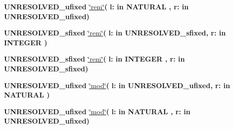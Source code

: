 \begin{DoxyCompactItemize}
\item 
{\bfseries {\bfseries \textcolor{vhdlchar}{U\+N\+R\+E\+S\+O\+L\+V\+E\+D\+\_\+ufixed}\textcolor{vhdlchar}{ }}} \hyperlink{class__fixed__pkg_a66a380593306e6133903e7a5cb03056a}{\char`\"{}rem\char`\"{}}{\bfseries  ( }{\bfseries \textcolor{vhdlchar}{l\+: }\textcolor{stringliteral}{in }{\bfseries \textcolor{comment}{N\+A\+T\+U\+R\+A\+L}\textcolor{vhdlchar}{ }}}{\bfseries  , \textcolor{vhdlchar}{r\+: }\textcolor{stringliteral}{in }\textcolor{vhdlchar}{U\+N\+R\+E\+S\+O\+L\+V\+E\+D\+\_\+ufixed}}{\bfseries  )} 
\item 
{\bfseries {\bfseries \textcolor{vhdlchar}{U\+N\+R\+E\+S\+O\+L\+V\+E\+D\+\_\+sfixed}\textcolor{vhdlchar}{ }}} \hyperlink{class__fixed__pkg_ac069740ccb193c395e563f253d734127}{\char`\"{}rem\char`\"{}}{\bfseries  ( }{\bfseries \textcolor{vhdlchar}{l\+: }\textcolor{stringliteral}{in }\textcolor{vhdlchar}{U\+N\+R\+E\+S\+O\+L\+V\+E\+D\+\_\+sfixed}}{\bfseries  , \textcolor{vhdlchar}{r\+: }\textcolor{stringliteral}{in }{\bfseries \textcolor{comment}{I\+N\+T\+E\+G\+E\+R}\textcolor{vhdlchar}{ }}}{\bfseries  )} 
\item 
{\bfseries {\bfseries \textcolor{vhdlchar}{U\+N\+R\+E\+S\+O\+L\+V\+E\+D\+\_\+sfixed}\textcolor{vhdlchar}{ }}} \hyperlink{class__fixed__pkg_ac069740ccb193c395e563f253d734127}{\char`\"{}rem\char`\"{}}{\bfseries  ( }{\bfseries \textcolor{vhdlchar}{l\+: }\textcolor{stringliteral}{in }{\bfseries \textcolor{comment}{I\+N\+T\+E\+G\+E\+R}\textcolor{vhdlchar}{ }}}{\bfseries  , \textcolor{vhdlchar}{r\+: }\textcolor{stringliteral}{in }\textcolor{vhdlchar}{U\+N\+R\+E\+S\+O\+L\+V\+E\+D\+\_\+sfixed}}{\bfseries  )} 
\item 
{\bfseries {\bfseries \textcolor{vhdlchar}{U\+N\+R\+E\+S\+O\+L\+V\+E\+D\+\_\+ufixed}\textcolor{vhdlchar}{ }}} \hyperlink{class__fixed__pkg_adcb31bd19e000188752c17ad006b956d}{\char`\"{}mod\char`\"{}}{\bfseries  ( }{\bfseries \textcolor{vhdlchar}{l\+: }\textcolor{stringliteral}{in }\textcolor{vhdlchar}{U\+N\+R\+E\+S\+O\+L\+V\+E\+D\+\_\+ufixed}}{\bfseries  , \textcolor{vhdlchar}{r\+: }\textcolor{stringliteral}{in }{\bfseries \textcolor{comment}{N\+A\+T\+U\+R\+A\+L}\textcolor{vhdlchar}{ }}}{\bfseries  )} 
\item 
{\bfseries {\bfseries \textcolor{vhdlchar}{U\+N\+R\+E\+S\+O\+L\+V\+E\+D\+\_\+ufixed}\textcolor{vhdlchar}{ }}} \hyperlink{class__fixed__pkg_adcb31bd19e000188752c17ad006b956d}{\char`\"{}mod\char`\"{}}{\bfseries  ( }{\bfseries \textcolor{vhdlchar}{l\+: }\textcolor{stringliteral}{in }{\bfseries \textcolor{comment}{N\+A\+T\+U\+R\+A\+L}\textcolor{vhdlchar}{ }}}{\bfseries  , \textcolor{vhdlchar}{r\+: }\textcolor{stringliteral}{in }\textcolor{vhdlchar}{U\+N\+R\+E\+S\+O\+L\+V\+E\+D\+\_\+ufixed}}{\bfseries  )} 

\end{DoxyCompactItemize}
